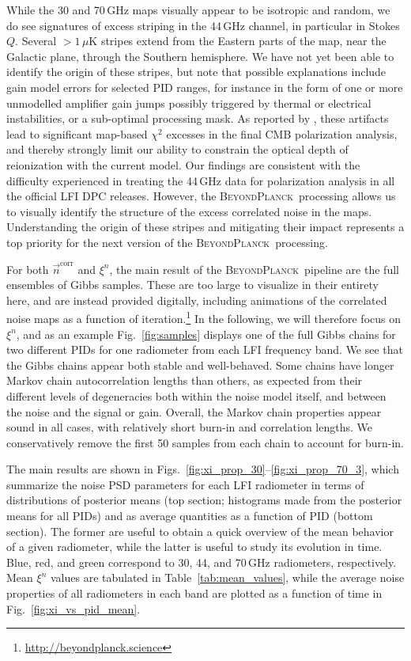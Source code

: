 \documentclass[twocolumn]{aa}
\newcommand{\n}[0]{\vec{n}}
\newcommand{\BP}{\textsc{BeyondPlanck}}
\begin{document}
While the 30 and 70\,GHz maps visually appear to be
isotropic and random, we do see signatures of excess striping in
the 44\,GHz channel, in particular in Stokes $Q$. 
Several $>$$1\,\mu$K stripes extend from the Eastern parts of the
map, near the Galactic plane, through the Southern hemisphere. We have not yet been able to identify the origin
of these stripes, but note that possible explanations include gain
model errors for selected PID ranges, for instance in the form of
one or more unmodelled amplifier gain jumps possibly triggered by thermal or
electrical instabilities, or a sub-optimal processing mask. As reported by
\citet{bp01,bp14,bp15}, these
artifacts lead to significant map-based $\chi^2$ excesses in the
final CMB polarization analysis, and thereby strongly limit our
ability to constrain the optical depth of reionization with the
current model. Our findings are consistent with the difficulty 
experienced in treating the 44\,GHz data for polarization 
analysis in all the official LFI DPC releases. However, the \BP\ processing
allows us to visually identify the structure of the excess 
correlated noise in the maps. Understanding the origin of 
these stripes and mitigating their impact represents a top 
priority for the next version of the \BP\ processing.

For both $\n^{\mathrm{corr}}$ and $\xi^n$, the main result of the
\BP\ pipeline are the full ensembles of Gibbs samples. These are
too large to visualize in their entirety here, and 
are instead provided digitally, including animations
of the correlated noise maps as a function of
iteration.\footnote{\url{http://beyondplanck.science}} In the
following, we will therefore focus on $\xi^n$, and as an example
Fig.~\ref{fig:samples} displays one of the full Gibbs chains for two
different PIDs for one radiometer from each LFI frequency band. We see
that the Gibbs chains appear both stable and well-behaved. Some chains
have longer Markov chain autocorrelation lengths than others, as
expected from their different levels of degeneracies both within the
noise model itself, and between the noise and the signal or
gain. Overall, the Markov chain properties appear sound in all cases,
with relatively short burn-in and correlation lengths. We
conservatively remove the first 50 samples from each chain to account
for burn-in.

The main results are shown in
Figs.~\ref{fig:xi_prop_30}--\ref{fig:xi_prop_70_3}, which summarize
the noise PSD parameters for each LFI radiometer in terms of
distributions of posterior means (top section; histograms made from
the posterior means for all PIDs) and as average quantities as a function 
of PID (bottom section). The former are useful to obtain a quick overview of
the mean behavior of a given radiometer, while the latter is useful
to study its evolution in time. Blue, red, and green correspond
to 30, 44, and 70\,GHz radiometers, respectively. Mean $\xi^n$ values
are tabulated in Table~\ref{tab:mean_values}, while the average noise
properties of all radiometers in each band are plotted as a function
of time in Fig.~\ref{fig:xi_vs_pid_mean}.
\end{document}
